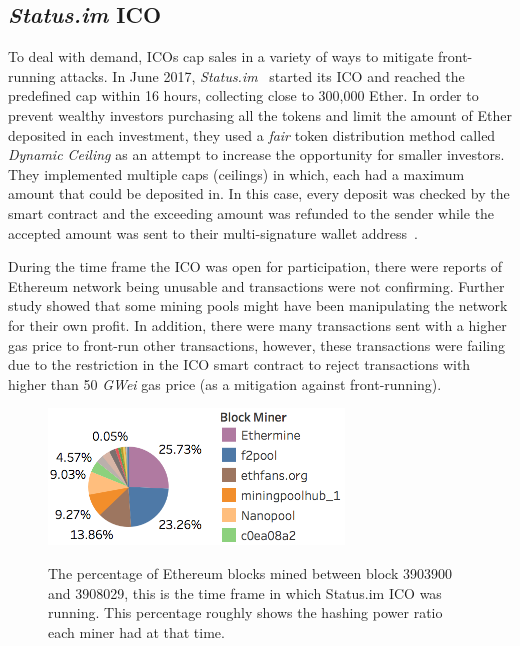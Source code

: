 \subsection{\textit{Status.im} ICO}
To deal with demand, ICOs cap sales in a variety of ways to mitigate front-running attacks. In June 2017, \textit{Status.im}~\cite{statuswhitepaper} started its ICO and reached the predefined cap within 16 hours, collecting close to 300,000 Ether. In order to prevent wealthy investors purchasing all the tokens and limit the amount of Ether deposited in each investment, they used a \textit{fair} token distribution method called \textit{Dynamic Ceiling} as an attempt to increase the opportunity for smaller investors. They implemented multiple caps (ceilings) in which, each had a maximum amount that could be deposited in. In this case, every deposit was checked by the smart contract and the exceeding amount was refunded to the sender while the accepted amount was sent to their multi-signature wallet address~\cite{statusicoanalysis}.

During the time frame the ICO was open for participation, there were reports of Ethereum network being unusable and transactions were not confirming. Further study showed that some mining pools might have been manipulating the network for their own profit. In addition, there were many transactions sent with a higher gas price to front-run other transactions, however, these transactions were failing due to the restriction in the ICO smart contract to reject transactions with higher than 50 \textit{GWei} gas price (as a mitigation against front-running).


\begin{figure}[t]
    \centering
{\includegraphics[width=0.7\textwidth]{figures/Mining_pool_ratio.png}}
{\caption[Ethereum Blocks Producers During the Time of Status.im ICO]{The percentage of Ethereum blocks mined between block 3903900 and 3908029, this is the time frame in which Status.im ICO was running. This percentage roughly shows the hashing power ratio each miner had at that time.}\label{fig:mining_pool_ratio}}
\end{figure}


